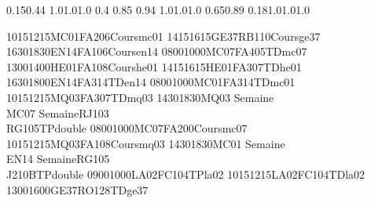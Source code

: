 \documentclass[a4paper,10pt]{report}
\begin{document}
 \thispagestyle{empty}
 \begin{landscape}
 
 \setslotsize{2.8cm}{0.25cm}
 \settextframe{1.0mm}
 
  {0.15}{0.44} {1.0}{1.0}{1.0}
     {0.4} {0.85} {0.94} {1.0}{1.0}{1.0}
        {0.65}{0.89} {0.18}{1.0}{1.0}{1.0}
 
 
 \begin{timetable}

 
    {1015}{1215}{MC01}{FA206}{{\tiny Cours}}{mc01}
    {1415}{1615}{GE37}{RB110}{{\tiny Cours}}{ge37}
    {1630}{1830}{EN14}{FA106}{{\tiny Cours}}{en14}
    {0800}{1000}{MC07}{FA405}{{\tiny TD}}{mc07}
    {1300}{1400}{HE01}{FA108}{{\tiny Cours}}{he01}
    {1415}{1615}{HE01}{FA307}{{\tiny TD}}{he01}
    {1630}{1800}{EN14}{FA314}{{\tiny TD}}{en14}
    {0800}{1000}{MC01}{FA314}{{\tiny TD}}{mc01}
    {1015}{1215}{MQ03}{FA307}{{\tiny TD}}{mq03}
    {1430}{1830}{MQ03 {\tiny Semaine}\\MC07 {\tiny Semaine}}{RJ103\\RG105}{{\tiny TP}}{double}
    {0800}{1000}{MC07}{FA200}{{\tiny Cours}}{mc07}
    {1015}{1215}{MQ03}{FA108}{{\tiny Cours}}{mq03}
    {1430}{1830}{MC01 {\tiny Semaine}\\EN14 {\tiny Semaine}}{RG105\\J210B}{{\tiny TP}}{double}
    {0900}{1000}{LA02}{FC104}{{\tiny TP}}{la02}
    {1015}{1215}{LA02}{FC104}{{\tiny TD}}{la02}
    {1300}{1600}{GE37}{RO128}{{\tiny TD}}{ge37}
   
 \end{timetable}
 \end{landscape}
 
\end{document}
